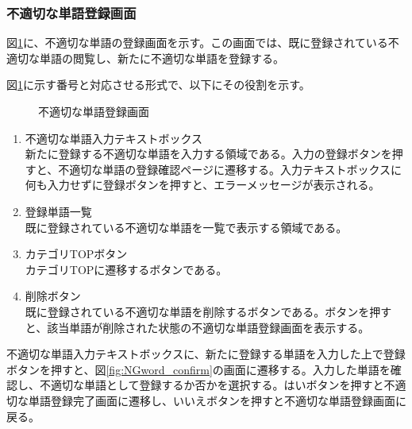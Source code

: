 \documentclass[a4j]{jarticle}
\begin{document}
\subsubsection{不適切な単語登録画面}
図\ref{fig:NGword}に、不適切な単語の登録画面を示す。この画面では、既に登録されている不適切な単語の閲覧し、新たに不適切な単語を登録する。

図\ref{fig:NGword}に示す番号と対応させる形式で、以下にその役割を示す。
\begin{figure}[H]
\centering
{}
\caption{不適切な単語登録画面}
\label{fig:NGword}
\end{figure}
\begin{enumerate}
  \renewcommand{\labelenumi}{\textcircled{\scriptsize \theenumi}}
  \item 不適切な単語入力テキストボックス\\
  新たに登録する不適切な単語を入力する領域である。入力の登録ボタンを押すと、不適切な単語の登録確認ページに遷移する。入力テキストボックスに何も入力せずに登録ボタンを押すと、エラーメッセージが表示される。
  \item 登録単語一覧\\
  既に登録されている不適切な単語を一覧で表示する領域である。
  \item カテゴリTOPボタン\\
  カテゴリTOPに遷移するボタンである。
  \item 削除ボタン\\
  既に登録されている不適切な単語を削除するボタンである。ボタンを押すと、該当単語が削除された状態の不適切な単語登録画面を表示する。
\end{enumerate}
不適切な単語入力テキストボックスに、新たに登録する単語を入力した上で登録ボタンを押すと、図\ref{fig:NGword_confirm}の画面に遷移する。入力した単語を確認し、不適切な単語として登録するか否かを選択する。はいボタンを押すと不適切な単語登録完了画面に遷移し、いいえボタンを押すと不適切な単語登録画面に戻る。
\end{document}
